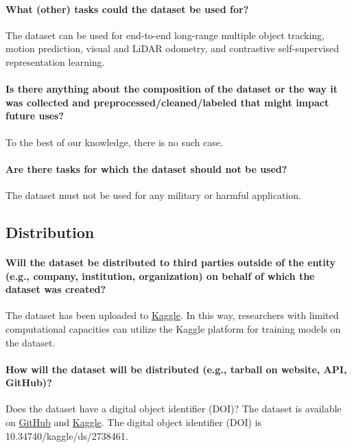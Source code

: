 \documentclass{article}
\begin{document}
\paragraph{What (other) tasks could the dataset be used for?} The dataset can be used for end-to-end long-range multiple object tracking, motion prediction, visual and LiDAR odometry, and contrastive self-supervised representation learning.

\paragraph{Is there anything about the composition of the dataset or the way it was collected and preprocessed/cleaned/labeled that might impact future uses?} To the best of our knowledge, there is no such case.

\paragraph{Are there tasks for which the dataset should not be used?} The dataset must not be used for any military or harmful application.


\subsection{Distribution}
\paragraph{Will the dataset be distributed to third parties outside of the entity (e.g., company, institution, organization) on behalf of which the dataset was created?} The dataset has been uploaded to \href{https://www.kaggle.com/datasets/tamasmatuszka/aimotive-multimodal-dataset}{Kaggle}. In this way, researchers with limited computational capacities can utilize the Kaggle platform for training models on the dataset.

\paragraph{How will the dataset will be distributed (e.g., tarball on website, API, GitHub)?} Does the dataset have a digital object identifier (DOI)?
The dataset is available on \href{https://github.com/aimotive/aimotive_dataset}{GitHub} and \href{https://www.kaggle.com/datasets/tamasmatuszka/aimotive-multimodal-dataset}{Kaggle}. The digital object identifier (DOI) is 10.34740/kaggle/ds/2738461.
\end{document}

